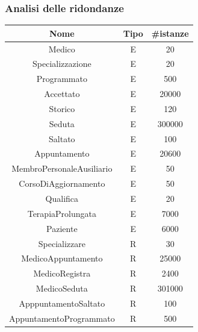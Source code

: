 \documentclass[11pt]{article}
\begin{document}
\subsubsection{Analisi delle ridondanze}
\label{er:ridondanze1}
\begin{table}[H]
\begin{tabular}{|c|c|c|}
\hline \textbf{Nome}             & \textbf{Tipo} & \textbf{\#istanze} \\
\hline Medico                    & E             & 20                 \\
\hline Specializzazione          & E             & 20                 \\
\hline Programmato               & E             & 500                \\
\hline Accettato                 & E             & 20000              \\
\hline Storico                   & E             & 120                \\
\hline Seduta                    & E             & 300000             \\
\hline Saltato                   & E             & 100                \\
\hline Appuntamento              & E             & 20600              \\
\hline MembroPersonaleAusiliario & E             & 50                 \\
\hline CorsoDiAggiornamento      & E             & 50                 \\
\hline Qualifica                 & E             & 20                 \\
\hline TerapiaProlungata         & E             & 7000               \\
\hline Paziente                  & E             & 6000               \\
\hline Specializzare             & R             & 30                 \\
\hline MedicoAppuntamento        & R             & 25000              \\
\hline MedicoRegistra            & R             & 2400               \\
\hline MedicoSeduta              & R             & 301000             \\
\hline ApppuntamentoSaltato      & R             & 100                \\
\hline AppuntamentoProgrammato   & R             & 500                \\

\end{tabular}
\end{table}
\end{document}
